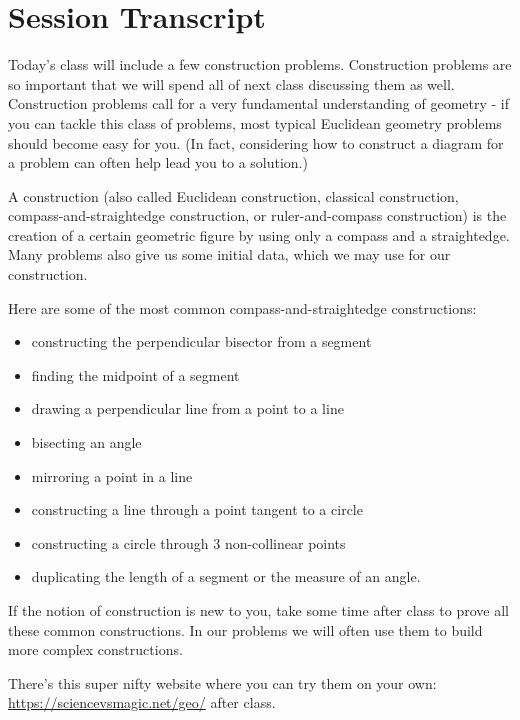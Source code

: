 \section{Session Transcript}
Today's class will include a few construction problems. Construction problems are so important that we will spend all of next class discussing them as well. Construction problems call for a very fundamental understanding of geometry - if you can tackle this class of problems, most typical Euclidean geometry problems should become easy for you. (In fact, considering how to construct a diagram for a problem can often help lead you to a solution.)

A construction (also called Euclidean construction, classical construction, compass-and-straightedge construction, or ruler-and-compass construction) is the creation of a certain geometric figure by using only a compass and a straightedge. Many problems also give us some initial data, which we may use for our construction.


Here are some of the most common compass-and-straightedge constructions: 
\begin{itemize}
    \item constructing the perpendicular bisector from a segment
    \item finding the midpoint of a segment
    \item drawing a perpendicular line from a point to a line
    \item bisecting an angle
    \item mirroring a point in a line
    \item constructing a line through a point tangent to a circle
    \item constructing a circle through 3 non-collinear points
    \item duplicating the length of a segment or the measure of an angle.    
\end{itemize}

If the notion of construction is new to you, take some time after class to prove all these common constructions. In our problems we will often use them to build more complex constructions.

There's this super nifty website where you can try them on your own: \url{https://sciencevsmagic.net/geo/} after class.

